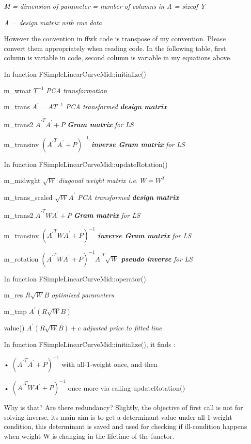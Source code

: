 \emph{M = dimension of parameter = number of columns in A = sizeof Y}

\emph{A = design matrix with row data}

However the convention in ffwk code is transpose of my convention.
Please convert them appropriately when reading code. In the following
table, first column is variable in code, second column is variable in my
equations above.

In function FSimpleLinearCurveMid::initialize()

m\_wmat \(T^{- 1}\) \emph{PCA transformation}

m\_trans \(A^{'} = AT^{- 1}\) \emph{PCA transformed \textbf{design
matrix}}

m\_trans2 \({A^{'}}^{T}A^{'} + P\) \emph{\textbf{Gram matrix} for LS}

m\_transinv \(\left( {A^{'}}^{T}A^{'} + P \right)^{- 1}\)
\emph{\textbf{inverse Gram matrix} for LS}

In function FSimpleLinearCurveMid::updateRotation()

m\_midwght \(\sqrt{W}\) \emph{diagonal weight matrix i.e.} \(W = W^{T}\)

m\_trans\_scaled \({\sqrt{W}A}^{'}\) \emph{PCA transformed
\textbf{design matrix}}

m\_trans2 \({A^{'}}^{T}{WA}^{'} + P\) \emph{\textbf{Gram matrix} for LS}

m\_transinv \(\left( {A^{'}}^{T}WA^{'} + P \right)^{- 1}\)
\emph{\textbf{inverse Gram matrix} for LS}

m\_rotation
\(\left( {A^{'}}^{T}WA^{'} + P \right)^{- 1}{A^{'}}^{T}\sqrt{W}\)
\emph{\textbf{pseudo inverse} for LS}

In function FSimpleLinearCurveMid::operator()

m\_res \(R\sqrt{W}B\) \emph{optimized parameters}

m\_tmp \(A^{'}(R\sqrt{W}B)\)

value() \(A^{'}(R\sqrt{W}B) + c\) \emph{adjusted price to fitted line}

In function FSimpleLinearCurveMid::initialize(), it finds :

• \(\left( {A^{'}}^{T}A^{'} + P \right)^{- 1}\) with all-1-weight once,
and then

• \(\left( {A^{'}}^{T}WA^{'} + P \right)^{- 1}\) once more via calling
updateRotation()

Why is that? Are there redundancy? Slightly, the objective of first call
is not for solving inverse, its main aim is to get a determinant value
under all-1-weight condition, this determinant is saved and used for
checking if ill-condition happens when weight W is changing in the
lifetime of the functor.

